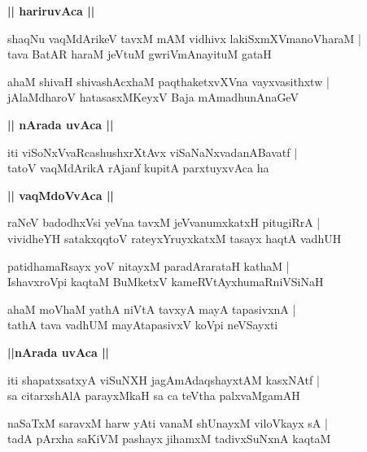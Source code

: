 \documentclass[twoside,12pt,openright]{book}
\newcounter{shloka}[chapter]
\def\uvaca#1{\centerline{{\large\textbf{#1}}}}
\begin{document}
\uvaca{|| hariruvAca ||}

\begin{shloka}%
shaqNu vaqMdArikeV tavxM mAM vidhivx lakiSxmXVmanoVharaM |\\
tava BatAR haraM jeVtuM gwriVmAnayituM gataH 
\end{shloka}

\begin{shloka}%
ahaM shivaH shivashAcxhaM paqthaketxvXVna vayxvasithxtw |\\
jAlaMdharoV hatasasxMKeyxV Baja mAmadhunAnaGeV 
\end{shloka}

\uvaca{|| nArada uvAca ||}

\begin{shloka}%
iti viSoNxVvaRcashushxrXtAvx viSaNaNxvadanABavatf |\\
tatoV vaqMdArikA rAjanf kupitA parxtuyxvAca ha 
\end{shloka}

\uvaca{|| vaqMdoVvAca ||}

\begin{shloka}%
raNeV badodhxVsi yeVna tavxM jeVvanumxkatxH pitugiRrA |\\
vividheYH satakxqqtoV rateyxYruyxkatxM tasayx haqtA vadhUH 
\end{shloka}

\begin{shloka}%
patidhamaRsayx yoV nitayxM paradArarataH kathaM |\\
IshavxroVpi kaqtaM BuMketxV kameRVtAyxhumaRniVSiNaH 
\end{shloka}

\begin{shloka}%
ahaM moVhaM yathA niVtA tavxyA mayA tapasivxnA |\\
tathA tava vadhUM mayAtapasivxV koVpi neVSayxti 
\end{shloka}

\uvaca{||nArada uvAca ||}

\begin{shloka}%
iti shapatxsatxyA viSuNXH jagAmAdaqshayxtAM kasxNAtf |\\
sa citarxshAlA parayxMkaH sa ca teVtha palxvaMgamAH 
\end{shloka}

\begin{shloka}%
naSaTxM saravxM harw yAti vanaM shUnayxM viloVkayx sA |\\
tadA pArxha saKiVM pashayx jihamxM tadivxSuNxnA kaqtaM 
\end{shloka}
\end{document}
